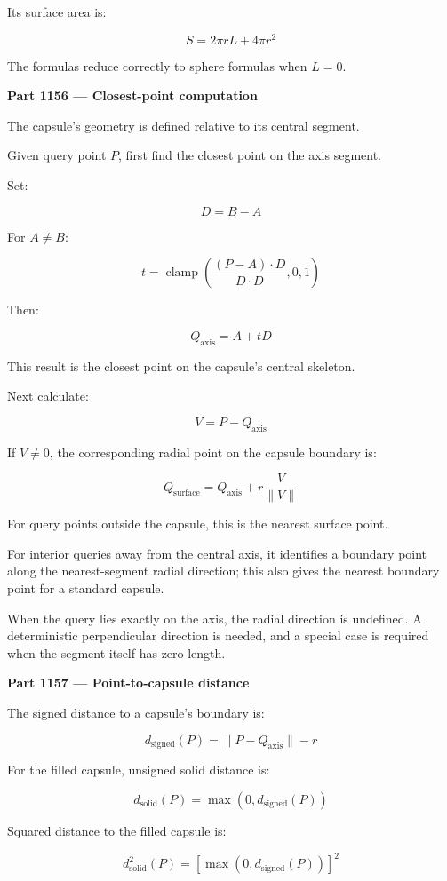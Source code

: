 Its surface area is:

\[
\boxed{ S=2\pi rL+4\pi r^2 }
\]

The formulas reduce correctly to sphere formulas when \(L=0\).

\textbf{Part 1156 --- Closest-point computation}

The capsule's geometry is defined relative to its central segment.

Given query point \(P\), first find the closest point on the axis segment.

Set:

\[
D=B-A
\]

For \(A\ne B\):

\[
t=\operatorname{clamp} \left( \frac{(P-A)\cdot D}{D\cdot D}, 0,1 \right)
\]

Then:

\[
\boxed{Q_{\mathrm{axis}}=A+tD}
\]

This result is the closest point on the capsule's central skeleton.

Next calculate:

\[
V=P-Q_{\mathrm{axis}}
\]

If \(V\ne0\), the corresponding radial point on the capsule boundary is:

\[
\boxed{ Q_{\mathrm{surface}} = Q_{\mathrm{axis}} + r\frac{V}{\|V\|} }
\]

For query points outside the capsule, this is the nearest surface point.

For interior queries away from the central axis, it identifies a boundary point along the nearest-segment radial direction; this also gives the nearest boundary point for a standard capsule.

When the query lies exactly on the axis, the radial direction is undefined. A deterministic perpendicular direction is needed, and a special case is required when the segment itself has zero length.

\textbf{Part 1157 --- Point-to-capsule distance}

The signed distance to a capsule's boundary is:

\[
\boxed{ d_{\mathrm{signed}}(P)= \|P-Q_{\mathrm{axis}}\|-r }
\]

For the filled capsule, unsigned solid distance is:

\[
\boxed{ d_{\mathrm{solid}}(P)= \max(0,d_{\mathrm{signed}}(P)) }
\]

Squared distance to the filled capsule is:

\[
\boxed{ d_{\mathrm{solid}}^2(P)= \left[\max(0,d_{\mathrm{signed}}(P))\right]^2 }
\]

